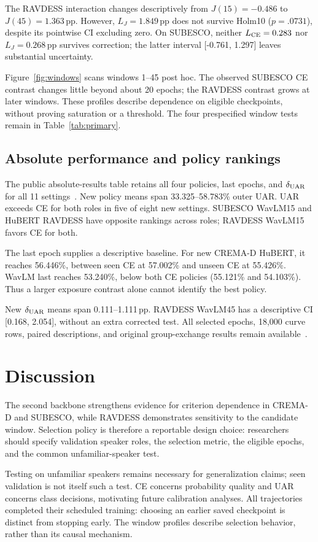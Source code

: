 \documentclass[letterpaper]{article}
\begin{document}
The RAVDESS interaction changes descriptively from $J(15)=-0.486$ to $J(45)=1.363$\,pp. However, $L_J=1.849$\,pp does not survive Holm10 ($p=.0731$), despite its pointwise CI excluding zero. On SUBESCO, neither $L_{\rm CE}=0.283$ nor $L_J=0.268$\,pp survives correction; the latter interval [-0.761, 1.297] leaves substantial uncertainty.

Figure~\ref{fig:windows} scans windows 1--45 post hoc. The observed SUBESCO CE contrast changes little beyond about 20 epochs; the RAVDESS contrast grows at later windows. These profiles describe dependence on eligible checkpoints, without proving saturation or a threshold. The four prespecified window tests remain in Table~\ref{tab:primary}.

\subsection{Absolute performance and policy rankings}
The public absolute-results table retains all four policies, last epochs, and $\delta_{\rm UAR}$ for all 11 settings~\cite{artifact}. New policy means span 33.325--58.783\% outer UAR. UAR exceeds CE for both roles in five of eight new settings. SUBESCO WavLM15 and HuBERT RAVDESS have opposite rankings across roles; RAVDESS WavLM15 favors CE for both.

The last epoch supplies a descriptive baseline. For new CREMA-D HuBERT, it reaches 56.446\%, between seen CE at 57.002\% and unseen CE at 55.426\%. WavLM last reaches 53.240\%, below both CE policies (55.121\% and 54.103\%). Thus a larger exposure contrast alone cannot identify the best policy.

New $\delta_{\rm UAR}$ means span 0.111--1.111\,pp. RAVDESS WavLM45 has a descriptive CI [0.168, 2.054], without an extra corrected test. All selected epochs, 18,000 curve rows, paired descriptions, and original group-exchange results remain available~\cite{artifact}.

\section{Discussion}
The second backbone strengthens evidence for criterion dependence in CREMA-D and SUBESCO, while RAVDESS demonstrates sensitivity to the candidate window. Selection policy is therefore a reportable design choice: researchers should specify validation speaker roles, the selection metric, the eligible epochs, and the common unfamiliar-speaker test.

Testing on unfamiliar speakers remains necessary for generalization claims; seen validation is not itself such a test. CE concerns probability quality and UAR concerns class decisions, motivating future calibration analyses. All trajectories completed their scheduled training: choosing an earlier saved checkpoint is distinct from stopping early. The window profiles describe selection behavior, rather than its causal mechanism.
\end{document}
